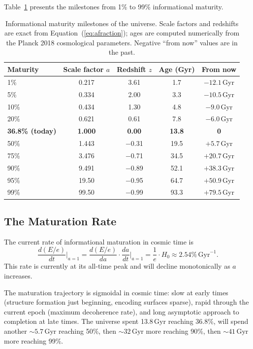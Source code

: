 \documentclass[12pt,letterpaper]{article}
\begin{document}
Table~\ref{tab:maturity} presents the milestones from 1\% to 99\% informational maturity.

\begin{table}[ht]
\centering
\caption{Informational maturity milestones of the universe. Scale factors and redshifts are exact from Equation~(\ref{eq:afraction}); ages are computed numerically from the Planck 2018 cosmological parameters. Negative ``from now'' values are in the past.}
\label{tab:maturity}
\begin{tabular}{lcccc}
\toprule
Maturity & Scale factor $a$ & Redshift $z$ & Age (Gyr) & From now \\
\midrule
1\%  & 0.217 & 3.61 &  1.7 & $-12.1$\,Gyr \\
5\%  & 0.334 & 2.00 &  3.3 & $-10.5$\,Gyr \\
10\% & 0.434 & 1.30 &  4.8 & $-9.0$\,Gyr  \\
20\% & 0.621 & 0.61 &  7.8 & $-6.0$\,Gyr  \\
\textbf{36.8\% (today)} & \textbf{1.000} & \textbf{0.00} & \textbf{13.8} & \textbf{0} \\
50\% & 1.443 & $-$0.31 & 19.5 & $+5.7$\,Gyr \\
75\% & 3.476 & $-$0.71 & 34.5 & $+20.7$\,Gyr \\
90\% & 9.491 & $-$0.89 & 52.1 & $+38.3$\,Gyr \\
95\% & 19.50 & $-$0.95 & 64.7 & $+50.9$\,Gyr \\
99\% & 99.50 & $-$0.99 & 93.3 & $+79.5$\,Gyr \\
\bottomrule
\end{tabular}
\end{table}

\subsection{The Maturation Rate}

The current rate of informational maturation in cosmic time is
\begin{equation}
    \frac{d(E/e)}{dt}\bigg|_{a=1} = \frac{d(E/e)}{da} \cdot \frac{da}{dt}\bigg|_{a=1} = \frac{1}{e} \cdot H_0 \approx 2.54\%\,\mathrm{Gyr}^{-1}.
    \label{eq:rate_time}
\end{equation}
This rate is currently at its all-time peak and will decline monotonically as $a$ increases.

The maturation trajectory is sigmoidal in cosmic time: slow at early times (structure formation just beginning, encoding surfaces sparse), rapid through the current epoch (maximum decoherence rate), and long asymptotic approach to completion at late times. The universe spent 13.8\,Gyr reaching 36.8\%, will spend another $\sim 5.7\,\mathrm{Gyr}$ reaching 50\%, then $\sim 32\,\mathrm{Gyr}$ more reaching 90\%, then $\sim 41\,\mathrm{Gyr}$ more reaching 99\%.
\end{document}
